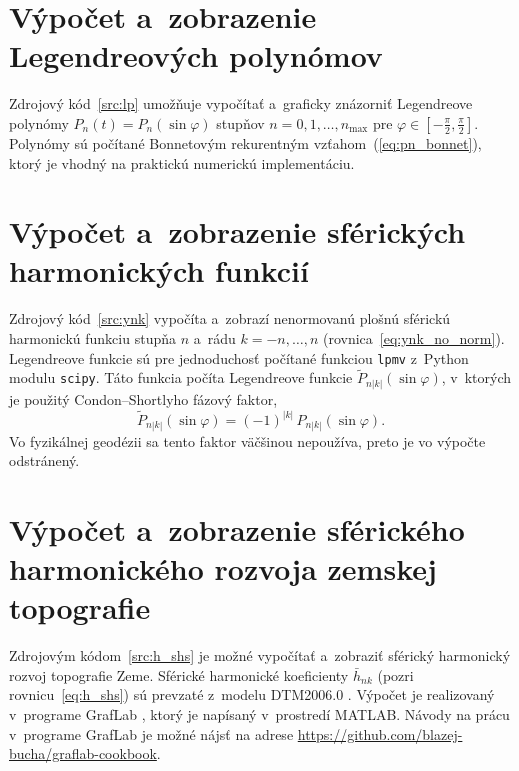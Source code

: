 \documentclass[a4paper, 12pt]{book}
\begin{document}
\chapter{Výpočet a~zobrazenie Legendreových polynómov}
\label{app:lp}

Zdrojový kód~\ref{src:lp} umožňuje vypočítať a~graficky znázorniť Legendreove
polynómy $P_n(t) = P_n(\sin\varphi)$ stupňov $n = 0, 1, \dots, n_{\max}$ pre
$\varphi \in [-\frac{\pi}{2}, \frac{\pi}{2}]$.  Polynómy sú počítané Bonnetovým
rekurentným vzťahom~(\ref{eq:pn_bonnet}), ktorý je vhodný na praktickú
numerickú implementáciu.







\chapter{Výpočet a~zobrazenie sférických harmonických funkcií}
\label{app:sh}

Zdrojový kód~\ref{src:ynk} vypočíta a~zobrazí nenormovanú plošnú sférickú
harmonickú funkciu stupňa $n$ a~rádu $k = -n, \dots, n$
(rovnica~\ref{eq:ynk_no_norm}).  Legendreove funkcie sú pre jednoduchosť
počítané funkciou \texttt{lpmv} z~Python modulu \texttt{scipy}.  Táto funkcia
počíta Legendreove funkcie $\tilde{P}_{n|k|}(\sin\varphi)$, v~ktorých je
použitý Condon--Shortlyho fázový faktor,
%
\begin{equation}
\tilde{P}_{n|k|}(\sin\varphi) = (-1)^{|k|} \, P_{n|k|}(\sin\varphi){.}
\end{equation}
%
Vo fyzikálnej geodézii sa tento faktor väčšinou nepoužíva, preto je vo výpočte
odstránený.








\chapter{Výpočet a~zobrazenie sférického harmonického rozvoja zemskej
topografie}
\label{app:shs_topography}

Zdrojovým kódom~\ref{src:h_shs} je možné vypočítať a~zobraziť sférický
harmonický rozvoj topografie Zeme.  Sférické harmonické koeficienty
$\bar{h}_{nk}$ (pozri rovnicu~\ref{eq:h_shs}) sú prevzaté z~modelu DTM2006.0
\citep{DTM2006}.  Výpočet je realizovaný v~programe GrafLab \citep{GrafLab},
ktorý je napísaný v~prostredí MATLAB.  Návody na prácu v~programe GrafLab je
možné nájsť na adrese \url{https://github.com/blazej-bucha/graflab-cookbook}.
\end{document}
